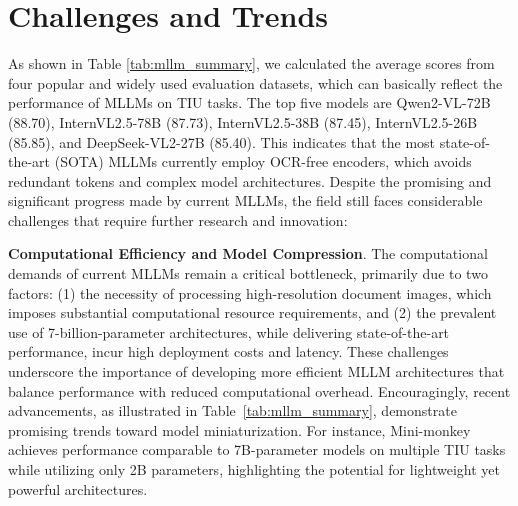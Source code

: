 \section{Challenges and Trends}
\label{sec:summary}


As shown in Table \ref{tab:mllm_summary}, we calculated the average scores from four popular and widely used evaluation datasets, which can basically reflect the performance of MLLMs on TIU tasks. The top five models are Qwen2-VL-72B (88.70), InternVL2.5-78B (87.73), InternVL2.5-38B (87.45), InternVL2.5-26B (85.85), and DeepSeek-VL2-27B (85.40). This indicates that the most state-of-the-art (SOTA) MLLMs currently employ OCR-free encoders, which avoids redundant tokens and complex model architectures. Despite the promising and significant progress made by current MLLMs, the field still faces considerable challenges that require further research and innovation:


\noindent \textbf{Computational Efficiency and Model Compression}. The computational demands of current MLLMs remain a critical bottleneck, primarily due to two factors: (1) the necessity of processing high-resolution document images, which imposes substantial computational resource requirements, and (2) the prevalent use of 7-billion-parameter architectures, while delivering state-of-the-art performance, incur high deployment costs and latency. These challenges underscore the importance of developing more efficient MLLM architectures that balance performance with reduced computational overhead. Encouragingly, recent advancements, as illustrated in Table~\ref{tab:mllm_summary}, demonstrate promising trends toward model miniaturization. For instance, Mini-monkey~\cite{Huang2024ARXIV_Mini_Monkey_Alleviating} achieves performance comparable to 7B-parameter models on multiple TIU tasks while utilizing only 2B parameters, highlighting the potential for lightweight yet powerful architectures.

